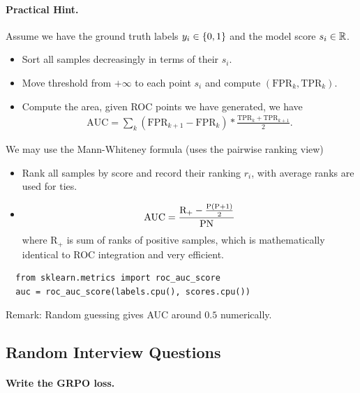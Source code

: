 \documentclass[11pt]{article}  %
\begin{document}
\paragraph{Practical Hint.}
Assume we have the ground truth labels $y_i \in \left\{ 0, 1 \right\}$ and the model score $s_i \in \mathbb{R}$.
\begin{itemize}
  \item Sort all samples decreasingly in terms of their $s_i$.
  \item Move threshold from $+\infty$ to each point $s_i$ and compute $(\text{FPR}_k, \text{TPR}_k)$.
  \item Compute the area, given ROC points we have generated, we have 
  \begin{align*}
    \text{AUC} = \sum_k (\text{FPR}_{k+1} - \text{FPR}_k) * \frac{\text{TPR}_k + \text{TPR}_{k+1}}{2}.
  \end{align*}
\end{itemize}

We may use the Mann-Whiteney formula (uses the pairwise ranking view)
\begin{itemize}
  \item Rank all samples by score and record their ranking $r_i$, with average ranks are used for ties.
  \item \begin{align*}
    \text{AUC} = \frac{\text{R}_+ - \frac{\text{P}\left( \text{P} + 1 \right)}{2}}{\text{PN}}
  \end{align*}
  where $\text{R}_+$ is sum of ranks of positive samples, which is mathematically identical to ROC integration and very efficient.
\end{itemize}

\begin{lstlisting}
  from sklearn.metrics import roc_auc_score
  auc = roc_auc_score(labels.cpu(), scores.cpu())
\end{lstlisting}
Remark: Random guessing gives AUC around $0.5$ numerically.


\subsection{Random Interview Questions}

\paragraph{Write the GRPO loss.}
\end{document}
